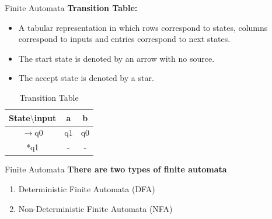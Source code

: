 \documentclass{beamer}
\begin{document}
\begin{frame}{Finite Automata}
	\textbf{Transition Table:}
	\begin{itemize}
		\item A tabular representation in which rows correspond to states, columns 
		correspond to inputs and entries correspond to next states.

		\item The start state is denoted by an arrow with no source.
		\item The accept state is denoted by a star.
	\end{itemize}
\begin{center}
\begin{table}
		\begin{tabular}{ c ||c |c }
		
		State$\setminus$input & a & b \\ 
		\hline
		\hline
		$\rightarrow$q0 & q1 & q0 \\  
		\hline
		*q1 & - & -    \\
		
	\end{tabular}
\caption{Transition Table}
\end{table}
\end{center}
\end{frame}
\begin{frame}{Finite Automata}
	\textbf{There are two types of finite automata}
	\begin{enumerate}
		\item Deterministic Finite Automata (DFA)
 		\item Non-Deterministic Finite Automata (NFA)
	\end{enumerate}
\end{frame}
\end{document}
